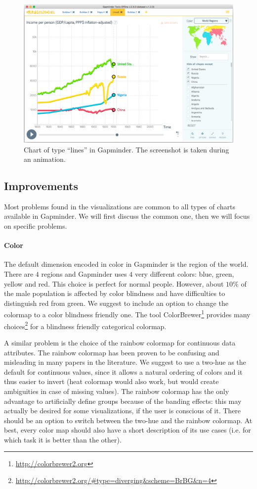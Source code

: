 \begin{figure}[h]
	\centering
	\includegraphics[width=0.95\columnwidth]{figures/lines-animation}
	\caption{Chart of type ``lines'' in Gapminder. The screenshot is taken during an animation.}
	\label{fig:lines-animation}
\end{figure}


\subsection{Improvements}
Most problems found in the visualizations are common to all types of charts available in Gapminder.
We will first discuss the common one, then we will focus on specific problems.

\paragraph{Color}
The default dimension encoded in color in Gapminder is the region of the world.
There are $4$ regions and Gapminder uses $4$ very different colors: blue, green, yellow and red.
This choice is perfect for normal people.
However, about $10\%$ of the male population is affected by color blindness \cite{color-maps} and have difficulties to distinguish red from green.
We suggest to include an option to change the colormap to a color blindness friendly one.
The tool ColorBrewer\footnote{\url{http://colorbrewer2.org}} provides many choices\footnote{\url{http://colorbrewer2.org/#type=diverging&scheme=BrBG&n=4}} for a blindness friendly categorical colormap.

A similar problem is the choice of the rainbow colormap for continuous data attributes.
The rainbow colormap has been proven to be confusing and misleading \cite{color-maps} in many papers in the literature.
We suggest to use a two-hue as the default for continuous values, since it allows a natural ordering of colors and it thus easier to invert (heat colormap would also work, but would create ambiguities in case of missing values).
The rainbow colormap has the only advantage to artificially define groups because of the banding effects:
this may actually be desired for some visualizations, if the user is conscious of it.
There should be an option to switch between the two-hue and the rainbow colormap.
At best, every color map should also have a short description of its use cases (i.e. for which task it is better than the other).

